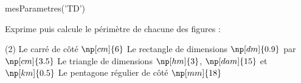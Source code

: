 \documentclass{classe-tex3R}
\begin{document}

\begin{luacode}
  mesParametres('TD')
  
\end{luacode}
\parametrage



\begin{enonce}
	Exprime puis calcule le périmètre de chacune des figures : 

	\begin{tasks}[style=enumerate](2)
		\task Le carré de côté $\np[cm]{6}$
		\task Le rectangle de dimensions $\np[dm]{0.9}$ par $\np[cm]{3.5}$
		\task Le triangle de dimensions $\np[hm]{3}$, $\np[dam]{15}$ et $\np[km]{0.5}$
		\task Le pentagone régulier de côté $\np[mm]{18}$
	\end{tasks}
\end{enonce}



\end{document}
